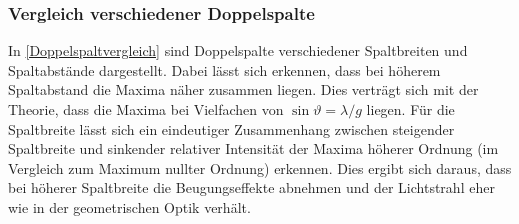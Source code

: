 \documentclass[
	a4paper,
	12pt,
	pagesize,
	ngerman
]{scrartcl}
\begin{document}
	\subsubsection{Vergleich verschiedener Doppelspalte}
	In \cref{Doppelspaltvergleich} sind Doppelspalte verschiedener Spaltbreiten und Spaltabstände dargestellt.
	Dabei lässt sich erkennen, dass bei höherem Spaltabstand die Maxima näher zusammen liegen.
	Dies verträgt sich mit der Theorie, dass die Maxima bei Vielfachen von $\sin \vartheta = \lambda /g $ liegen. \label{Doppelspalttheo}
	Für die Spaltbreite lässt sich ein eindeutiger Zusammenhang zwischen steigender Spaltbreite und sinkender relativer Intensität der Maxima höherer Ordnung (im Vergleich zum Maximum nullter Ordnung) erkennen.
	Dies ergibt sich daraus, dass bei höherer Spaltbreite die Beugungseffekte abnehmen und der Lichtstrahl eher wie in der geometrischen Optik verhält.
	
\end{document}
